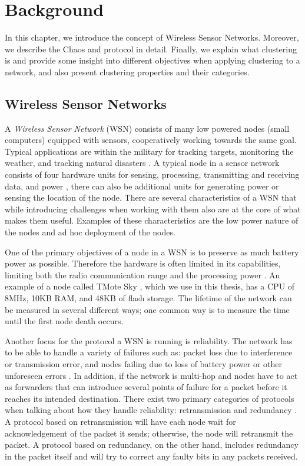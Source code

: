 \chapter{Background}

\label{chap:background}
In this chapter, we introduce the concept of Wireless Sensor Networks. Moreover, we describe the Chaos and \atwo{} protocol in detail. Finally, we explain what clustering is and provide some insight into different objectives when applying clustering to a network, and also present clustering properties and their categories.


\section{Wireless Sensor Networks}
A \emph{Wireless Sensor Network} (WSN) consists of many low powered nodes (small computers) equipped with sensors, cooperatively working towards the same goal. Typical applications are within the military for tracking targets, monitoring the weather, and tracking natural disasters \cite{Yick2008-wsn-survey}. A typical node in a sensor network consists of four hardware units for sensing, processing, transmitting and receiving data, and power \cite{Akyildiz2002-wsn-survey}, there can also be additional units for generating power or sensing the location of the node. There are several characteristics of a WSN that while introducing challenges when working with them also are at the core of what makes them useful. Examples of these characteristics are the low power nature of the nodes and ad hoc deployment of the nodes.


One of the primary objectives of a node in a WSN is to preserve as much battery power as possible. Therefore the hardware is often limited in its capabilities, limiting both the radio communication range and the processing power \cite{NikolaosA.Pantaziz2007-wsn-power-survey}. An example of a node called TMote Sky \cite{tmotesky-datasheet}, which we use in this thesis, has a CPU of 8MHz, 10KB RAM, and 48KB of flash storage. The lifetime of the network can be measured in several different ways; one common way is to measure the time until the first node death occurs.

Another focus for the protocol a WSN is running is reliability. The network has to be able to handle a variety of failures such as: packet loss due to interference or transmission error, and nodes failing due to loss of battery power or other unforeseen errors \cite{Mahmood2015-reliability-survey}. In addition, if the network is multi-hop and nodes have to act as forwarders that can introduce several points of failure for a packet before it reaches its intended destination. There exist two primary categories of protocols when talking about how they handle reliability: retransmission and redundancy \cite{Mahmood2015-reliability-survey}. A protocol based on retransmission will have each node wait for acknowledgement of the packet it sends; otherwise, the node will retransmit the packet. A protocol based on redundancy, on the other hand, includes redundancy in the packet itself and will try to correct any faulty bits in any packets received.



